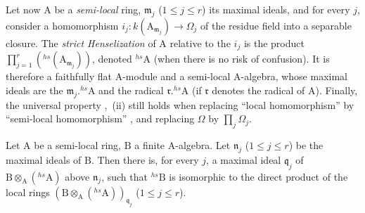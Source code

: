 \begin{env}[18.8.9]
\label{IV.18.8.9}
Let now A be a \emph{semi-local} ring, $\mathfrak{m}_j$ ($1\leq j\leq r$) its maximal ideals, and for every $j$, consider a homomorphism $i_j:k(\mathrm{A}_{\mathfrak{m}_j})\to\Omega_j$ of the residue field into a separable closure.
The \emph{strict Henselization} of A relative to the $i_j$ is the product $\prod_{j=1}^{r}({}^{hs}(\mathrm{A}_{\mathfrak{m}_j}))$, denoted ${}^{hs}\!\mathrm{A}$ (when there is no risk of confusion).
It is therefore a faithfully flat A-module and a semi-local A-algebra, whose maximal ideals are the $\mathfrak{m}_j.{}^{hs}\!\mathrm{A}$ and the radical $\mathfrak{r}.{}^{hs}\!\mathrm{A}$ (if $\mathfrak{r}$ denotes the radical of A).
Finally, the universal property ,~(ii) still holds when replacing ``local homomorphism'' by ``semi-local homomorphism'' , and replacing $\Omega$ by $\prod_j\Omega_j$.
\end{env}

\begin{proposition}[18.8.10]
\label{IV.18.8.10}
Let $\mathrm{A}$ be a semi-local ring, $\mathrm{B}$ a finite A-algebra.
Let $\mathfrak{n}_j$ ($1\leq j\leq r$) be the maximal ideals of $\mathrm{B}$.
Then there is, for every $j$, a maximal ideal $\mathfrak{q}_j$ of $\mathrm{B}\otimes_{\mathrm{A}}({}^{hs}\!\mathrm{A})$ above $\mathfrak{n}_j$, such that ${}^{hs}\!\mathrm{B}$ is isomorphic to the direct product of the local rings $(\mathrm{B}\otimes_{\mathrm{A}}({}^{hs}\!\mathrm{A}))_{\mathfrak{q}_j}$ ($1\leq j\leq r$).
\end{proposition}

